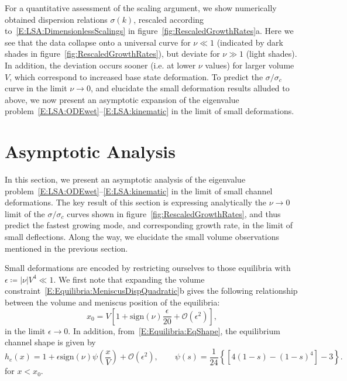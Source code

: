 \documentclass{jfm}
\newcommand{\order}[1]{\mathcal{O}\left(#1\right)}
\begin{document}
For a quantitative assessment of the scaling argument, we show numerically obtained dispersion relations $\sigma(k)$, rescaled according to~\eqref{E:LSA:DimensionlessScalings} in figure~\ref{fig:RescaledGrowthRates}a. Here we see that the data collapse onto a universal curve for $\nu \ll 1$ (indicated by dark shades in figure~\ref{fig:RescaledGrowthRates}), but deviate for $\nu \gg 1$ (light shades). In addition, the deviation occurs sooner (i.e. at lower $\nu$ values) for larger volume $V$, which correspond to increased base state deformation. To predict the $\sigma/\sigma_c$ curve in the limit $\nu \to 0$, and elucidate the small deformation results alluded to above, we now present an asymptotic expansion of the eigenvalue problem~\eqref{E:LSA:ODEwet}--\eqref{E:LSA:kinematic} in the limit of small deformations.


\section{Asymptotic Analysis}\label{S:Asymptotics}
\newcommand{\param}{\delta} %
In this section, we present an asymptotic analysis of the eigenvalue problem~\eqref{E:LSA:ODEwet}--\eqref{E:LSA:kinematic}  in the limit of small channel deformations. The key result of this section is expressing analytically the $\nu \to 0$ limit of the $\sigma/\sigma_c$ curves shown in figure~\ref{fig:RescaledGrowthRates}, and thus predict the fastest growing mode, and corresponding growth rate, in the limit of small deflections. Along the way, we elucidate the small volume observations mentioned in the previous section.

Small deformations are encoded by restricting ourselves to those equilibria with $\epsilon  \coloneqq |\nu| V^4 \ll 1$. We first note that expanding the volume constraint~\eqref{E:Equilibria:MeniscusDispQuadratic}b gives the following relationship between the volume and meniscus position of the  equilibria:
\begin{equation}\label{E:Asymptotics:EqMeniscusPositionExpansion}
    x_0 = V\left[1 + \mathrm{sign}(\nu) \frac{\epsilon}{20} + \order{\epsilon^2}\right],
\end{equation}
in the limit $\epsilon \to 0$. In addition, from~\eqref{E:Equilibria:EqShape}, the equilibrium channel shape is given by
\begin{equation}\label{E:Asymptotics:EqChannelShapeExpansion}
    h_e(x) = 1 + \epsilon \mathrm{sign}(\nu)\psi\left(\frac{x}{V}\right) + \order{\epsilon^2}, \qquad \psi(s) = \frac{1}{24}\left\{\left[4(1-s) - (1-s)^4\right]-3\right\}.
\end{equation}
for $x < x_0$.
\end{document}
